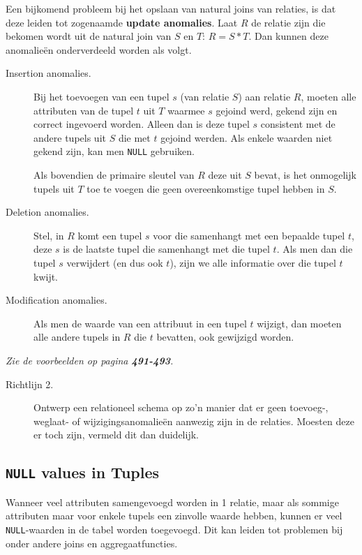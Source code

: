 Een bijkomend probleem bij het opslaan van natural joins van relaties, is dat deze leiden tot zogenaamde \textbf{update anomalies}. Laat $R$ de relatie zijn die bekomen wordt uit de natural join van $S$ en $T$: $R=S*T$. Dan kunnen deze anomalie\"en onderverdeeld worden als volgt. 
\begin{description}
	\item[Insertion anomalies.] Bij het toevoegen van een tupel $s$ (van relatie $S$) aan relatie $R$, moeten alle attributen van de tupel $t$ uit $T$ waarmee $s$ gejoind werd, gekend zijn en correct ingevoerd worden. Alleen dan is deze tupel $s$ consistent met de andere tupels uit $S$ die met $t$ gejoind werden. Als enkele waarden niet gekend zijn, kan men \texttt{NULL} gebruiken.

	Als bovendien de primaire sleutel van $R$ deze uit $S$ bevat, is het onmogelijk tupels uit $T$ toe te voegen die geen overeenkomstige tupel hebben in $S$.

	\item[Deletion anomalies.] Stel, in $R$ komt een tupel $s$ voor die samenhangt met een bepaalde tupel $t$, deze $s$ is de laatste tupel die samenhangt met die tupel $t$. Als men dan die tupel $s$ verwijdert (en dus ook $t$), zijn we alle informatie over die tupel $t$ kwijt.

	\item[Modification anomalies.] Als men de waarde van een attribuut in een tupel $t$ wijzigt, dan moeten alle andere tupels in $R$ die $t$ bevatten, ook gewijzigd worden.
\end{description}
\textit{Zie de voorbeelden op pagina \textbf{491-493}.}
\begin{description}
	\item[Richtlijn 2.] Ontwerp een relationeel schema op zo'n manier dat er geen toevoeg-, weglaat- of wijzigingsanomalie\"en aanwezig zijn in de relaties. Moesten deze er toch zijn, vermeld dit dan duidelijk.
\end{description}


\subsection{\texttt{NULL} values in Tuples}
Wanneer veel attributen samengevoegd worden in 1 relatie, maar als sommige attributen maar voor enkele tupels een zinvolle waarde hebben, kunnen er veel \texttt{NULL}-waarden in de tabel worden toegevoegd. Dit kan leiden tot problemen bij onder andere joins en aggregaatfuncties. 

